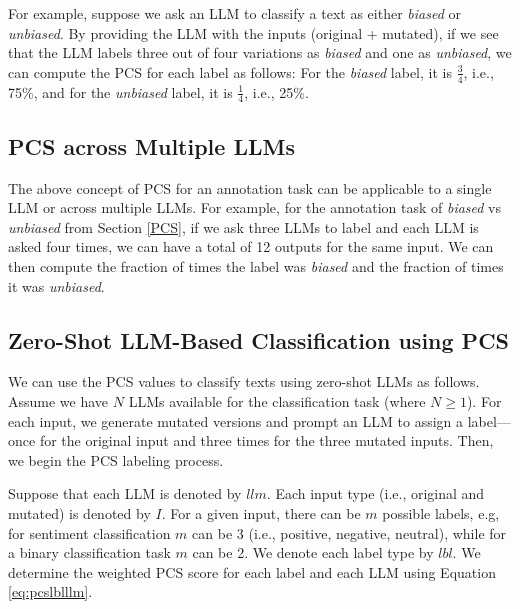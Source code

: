 For example, suppose we ask an LLM to classify a text as either \textit{biased} or \textit{unbiased}. By providing the LLM with the inputs (original + mutated), if we see that the LLM labels three out of four variations as \textit{biased} and one as \textit{unbiased}, we can compute the PCS for each label as follows: For the \textit{biased} label, it is $\frac{3}{4}$, i.e., 75\%, and for the \textit{unbiased} label, it is $\frac{1}{4}$, i.e., 25\%. 

\subsection {PCS across Multiple LLMs}
\label{PCS-multi}
The above concept of PCS for an annotation task can be applicable to a single LLM or across multiple LLMs. For example, for the annotation task of \textit{biased} vs \textit{unbiased} from Section \ref{PCS}, if we ask three LLMs to label and each LLM is asked four times, we can have a total of 12 outputs for the same input. We can then compute the fraction of times the label was \textit{biased} and the fraction of times it was
\textit{unbiased}. 

\subsection{Zero-Shot LLM-Based Classification using PCS}
We can use the PCS values to classify texts using zero-shot LLMs as follows. Assume we have $N$ LLMs available for the classification task (where $N\ge 1$). For each input, we generate mutated versions and prompt an LLM to assign a label—once for the original input and three times for the three mutated inputs. Then, we begin the PCS labeling process.

Suppose that each LLM is denoted by $llm$. Each input type (i.e., original and mutated) is denoted by $I$. For a given input, there can be $m$ possible labels, e.g, for sentiment classification $m$ can be 3 (i.e., positive, negative, neutral), while for a binary classification task $m$ can be 2. We denote each label type by $lbl$. We determine the weighted PCS score for each label and each LLM using Equation \ref{eq:pcslblllm}. 

